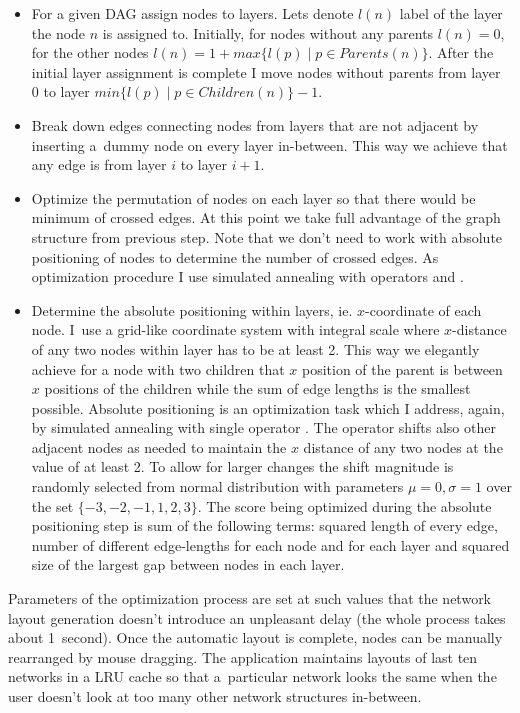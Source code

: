 \documentclass[english,cover]{fitthesis} %
\begin{document}
\begin{itemize}
	\item For a given DAG assign nodes to layers. Lets denote $l(n)$ label of the layer the node $n$ is assigned to. Initially, for nodes without any parents $l(n)=0$, for the other nodes $l(n) = 1 + max \lbrace l(p) \mid p \in Parents(n)\rbrace$. After the initial layer assignment is complete I move nodes without parents from layer 0 to layer $min \lbrace l(p) \mid p \in Children(n)\rbrace - 1$.
	\item Break down edges connecting nodes from layers that are not adjacent by inserting a~dummy node on every layer in-between. This way we achieve that any edge is from layer $i$ to layer $i+1$.
	\item Optimize the permutation of nodes on each layer so that there would be minimum of crossed edges. At this point we take full advantage of the graph structure from previous step. Note that we don't need to work with absolute positioning of nodes to determine the number of crossed edges. As optimization procedure I use simulated annealing with operators  and .
    \item Determine the absolute positioning within layers, ie. $x$-coordinate of each node. I~use a grid-like coordinate system with integral scale where $x$-distance of any two nodes within layer has to be at least 2. This way we elegantly achieve for a node with two children that $x$ position of the parent is between $x$ positions of the children while the sum of edge lengths is the smallest possible. Absolute positioning is an optimization task which I address, again, by simulated annealing with single operator . The operator shifts also other adjacent nodes as needed to maintain the $x$ distance of any two nodes at the value of at least 2. To allow for larger changes the shift magnitude is randomly selected from normal distribution with parameters $\mu=0, \sigma = 1$ over the set $\lbrace -3, -2, -1, 1, 2, 3\rbrace$. The score being optimized during the absolute positioning step is sum of the following terms: squared length of every edge, number of different edge-lengths for each node and for each layer and squared size of the largest gap between nodes in each layer.
\end{itemize}

Parameters of the optimization process are set at such values that the network layout generation doesn't introduce an unpleasant delay (the whole process takes about 1~second). Once the automatic layout is complete, nodes can be manually rearranged by mouse dragging. The application maintains layouts of last ten networks in a LRU cache so that a~particular network looks the same when the user doesn't look at too many other network structures in-between.
\end{document}
